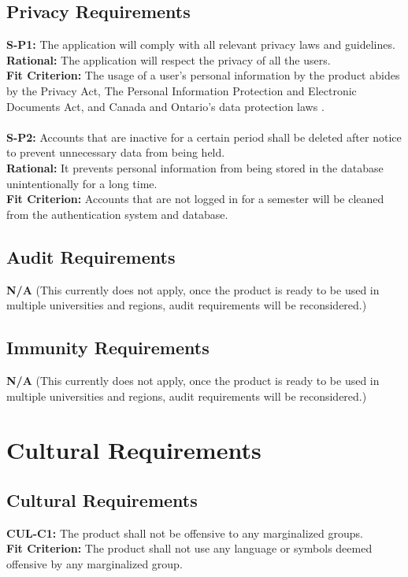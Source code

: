\documentclass[12pt]{article}
\begin{document}
\subsection{Privacy Requirements}
  \textbf{S-P1:} The application will comply with all relevant privacy laws and guidelines.\\
  \textbf{Rational:} The application will respect the privacy of all the users.\\
  \textbf{Fit Criterion:} The usage of a user’s personal information by the product abides by the Privacy Act, The Personal Information Protection and Electronic Documents Act, and Canada and Ontario’s data protection laws \cite{Legislative Services} \cite{CFLC}.\\\\
  \textbf{S-P2:} Accounts that are inactive for a certain period shall be deleted after notice to prevent unnecessary data from being held.\\
  \textbf{Rational:} It prevents personal information from being stored in the database unintentionally for a long time.\\
  \textbf{Fit Criterion:} Accounts that are not logged in for a semester will be cleaned from the authentication system and database.

\subsection{Audit Requirements}
  \textbf{N/A} (This currently does not apply, once the product is ready to be used in multiple universities and regions, audit requirements will be reconsidered.)\\
\subsection{Immunity Requirements}
  \textbf{N/A} (This currently does not apply, once the product is ready to be used in multiple universities and regions, audit requirements will be reconsidered.)\\

\section{Cultural Requirements}
\subsection{Cultural Requirements}
  \textbf{CUL-C1:} The product shall not be offensive to any marginalized groups.\\
  \textbf{Fit Criterion:} The product shall not use any language or symbols deemed offensive by any marginalized group.\\\\
\end{document}
